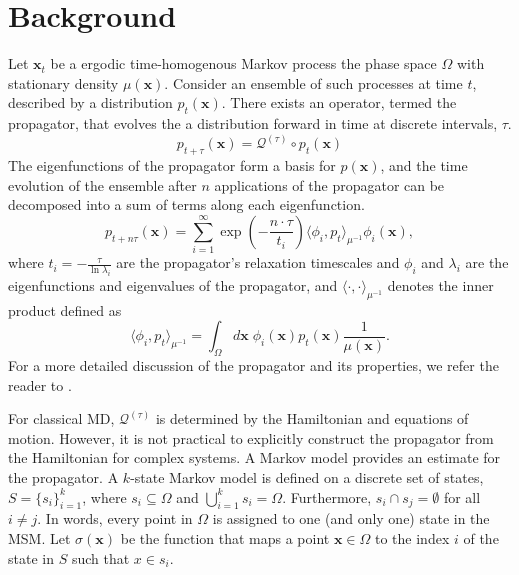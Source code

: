 \documentclass[journal=jpcbfk, layout=traditional, manuscript=article]{achemso}
\begin{document}
\section{Background}
Let $\mathbf{x}_t$ be a ergodic time-homogenous Markov process the phase space $\Omega$ with stationary density $\mu(\mathbf{x})$. Consider an ensemble of such processes at time $t$, described by a distribution $p_t(\mathbf{x})$. There exists an operator, termed the propagator, that evolves the a distribution forward in time at discrete intervals, $\tau$.
\begin{equation}
p_{t+\tau}(\mathbf{x}) = \mathcal{Q}^{(\tau)} \circ p_{t}(\mathbf{x})
\end{equation}
The eigenfunctions of the propagator form a basis for $p(\mathbf{x})$, and the time evolution of the ensemble after $n$ applications of the propagator can be decomposed into a sum of terms along each eigenfunction.
\begin{equation}
\label{eq:prop-timescales}
p_{t+n\tau}(\mathbf{x}) = \sum_{i=1}^\infty \exp\left(-\frac{n \cdot \tau}{t_i}\right) \langle \phi_i, p_t \rangle_{\mu^{-1}} \phi_i(\mathbf{x}),
\end{equation}
where $t_i = -\displaystyle\frac{\tau}{\ln \lambda_i}$ are the propagator's relaxation timescales and $\phi_i$ and $\lambda_i$ are the eigenfunctions and eigenvalues of the propagator, and $\langle \cdot, \cdot \rangle_{\mu^{-1}}$ denotes the inner product defined as
\begin{equation}
\langle \phi_i, p_t \rangle_{\mu^{-1}} = \int_\Omega d\mathbf{x}\; \phi_i(\mathbf{x}) p_t(\mathbf{x}) \frac{1}{\mu(\mathbf{x})}.
\end{equation}
For a more detailed discussion of the propagator and its properties, we refer the reader to \citet{Prinz2011Markov}.

For classical MD, $\mathcal{Q}^{(\tau)}$ is determined by the Hamiltonian and equations of motion\cite{Schutte2001Transfer}. However, it is not practical to explicitly construct the propagator from the Hamiltonian for complex systems. A Markov model provides an estimate for the propagator. A $k$-state Markov model is defined on a discrete set of states, $S = \{s_i\}_{i=1}^k$, where $s_i \subseteq \Omega$ and $\bigcup_{i=1}^k s_i = \Omega$. Furthermore, $s_i \cap s_j = \emptyset$ for all $i \neq j$. In words, every point in $\Omega$ is assigned to one (and only one) state in the MSM. Let $\sigma(\mathbf{x})$ be the function that maps a point $\mathbf{x} \in \Omega$ to the index $i$ of the state in $S$ such that $x \in s_i$.
\end{document}
